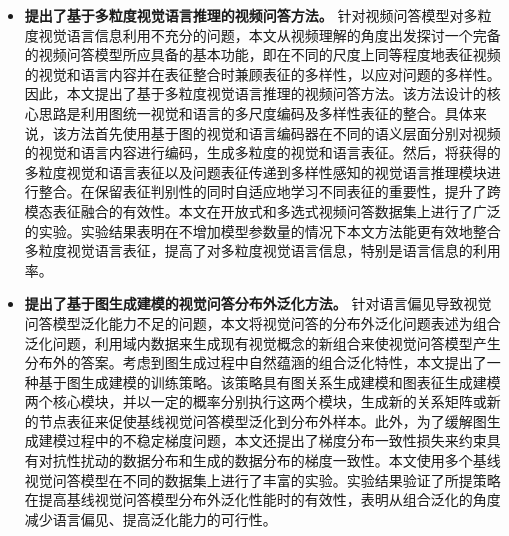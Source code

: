 \begin{itemize}[wide,leftmargin=0pt,itemsep=1pt]
\item \textbf{提出了基于多粒度视觉语言推理的视频问答方法。} 针对视频问答模型对多粒度视觉语言信息利用不充分的问题，本文从视频理解的角度出发探讨一个完备的视频问答模型所应具备的基本功能，即在不同的尺度上同等程度地表征视频的视觉和语言内容并在表征整合时兼顾表征的多样性，以应对问题的多样性。因此，本文提出了基于多粒度视觉语言推理的视频问答方法。该方法设计的核心思路是利用图统一视觉和语言的多尺度编码及多样性表征的整合。具体来说，该方法首先使用基于图的视觉和语言编码器在不同的语义层面分别对视频的视觉和语言内容进行编码，生成多粒度的视觉和语言表征。然后，将获得的多粒度视觉和语言表征以及问题表征传递到多样性感知的视觉语言推理模块进行整合。在保留表征判别性的同时自适应地学习不同表征的重要性，提升了跨模态表征融合的有效性。本文在开放式和多选式视频问答数据集上进行了广泛的实验。实验结果表明在不增加模型参数量的情况下本文方法能更有效地整合多粒度视觉语言表征，提高了对多粒度视觉语言信息，特别是语言信息的利用率。


\item \textbf{提出了基于图生成建模的视觉问答分布外泛化方法。} 针对语言偏见导致视觉问答模型泛化能力不足的问题，本文将视觉问答的分布外泛化问题表述为组合泛化问题，利用域内数据来生成现有视觉概念的新组合来使视觉问答模型产生分布外的答案。考虑到图生成过程中自然蕴涵的组合泛化特性，本文提出了一种基于图生成建模的训练策略。该策略具有图关系生成建模和图表征生成建模两个核心模块，并以一定的概率分别执行这两个模块，生成新的关系矩阵或新的节点表征来促使基线视觉问答模型泛化到分布外样本。此外，为了缓解图生成建模过程中的不稳定梯度问题，本文还提出了梯度分布一致性损失来约束具有对抗性扰动的数据分布和生成的数据分布的梯度一致性。本文使用多个基线视觉问答模型在不同的数据集上进行了丰富的实验。实验结果验证了所提策略在提高基线视觉问答模型分布外泛化性能时的有效性，表明从组合泛化的角度减少语言偏见、提高泛化能力的可行性。



\end{itemize}
